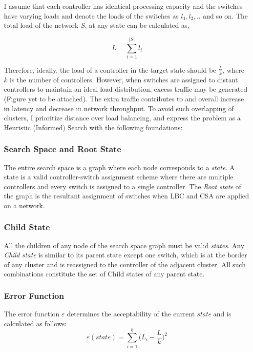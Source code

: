 \documentclass{IEEEtran}
\begin{document}
	I assume that each controller has identical processing capacity and the switches have varying loads and denote the loads of the switches as $l_1, l_2, . .$ and so on. The total load of the network $S$, at any state can be calculated as,
	
	\begin{equation}
		L=\sum_{i=1}^{|S|}l_i
	\end{equation}
	
	Therefore, ideally, the load of a controller in the target state should be $\frac{L}{k}$, where $k$ is the number of controllers. However, when switches are assigned to distant controllers to maintain an ideal load distribution, excess traffic may be generated (Figure yet to be attached). The extra traffic contributes to and overall increase in latency and decrease in network throughput. To avoid such overlapping of clusters, I prioritize distance over load balancing, and express the problem as a Heuristic (Informed) Search with the following foundations:
	
	\subsubsection{Search Space and Root State}
	The entire search space is a graph where each node corresponds to a \textit{state}. A state is a valid controller-switch assignment scheme where there are multiple controllers and every switch is assigned to a single controller. The \textit{Root state} of the graph is the resultant assignment of switches when LBC and CSA are applied on a network.
	
	\subsubsection{Child State}
	All the children of any node of the search space graph must be valid \textit{states}. Any \textit{Child state} is similar to its parent state except one switch, which is at the border of any cluster and is reassigned to the controller of the adjacent cluster. All such combinations constitute the set of Child states of any parent state.
	
	\subsubsection{Error Function}
	The error function $\varepsilon$ determines the acceptability of the current \textit{state} and is calculated as follows:
	\begin{equation}
		\varepsilon(state) = \sum_{i=1}^{k}\Big(L_i - \frac{L}{k}\Big)^2
	\end{equation}
	
\end{document}
